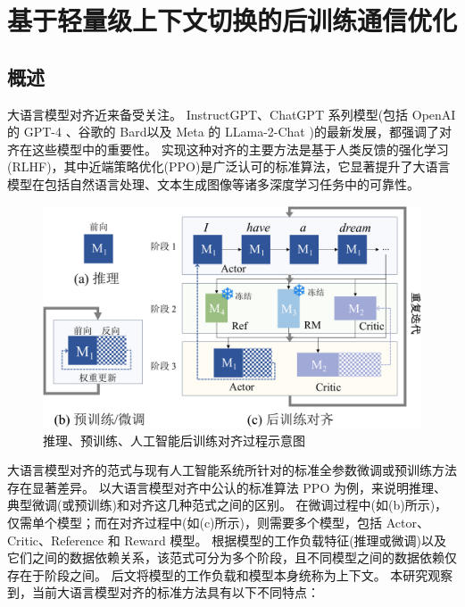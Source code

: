 
\chapter{基于轻量级上下文切换的后训练通信优化}

\section{概述}
大语言模型对齐近来备受关注。
InstructGPT\cite{ouyang2022instructgpt}、ChatGPT\cite{chatgpt} 系列模型(包括 OpenAI 的 GPT-4 \cite{openai2023gpt4}、谷歌的 Bard\cite{bard}以及 Meta 的 LLama-2-Chat \cite{touvron2023llama})的最新发展，都强调了对齐在这些模型中的重要性。
实现这种对齐的主要方法是基于人类反馈的强化学习(RLHF)，其中近端策略优化(PPO)是广泛认可的标准算法，它显著提升了大语言模型在包括自然语言处理\cite{chatgpt,kreutzer2018reliability}、文本生成图像\cite{wu2023visualchatgpt,lee2023aligning}等诸多深度学习任务中的可靠性。 

\begin{figure}[ht]
    \centering
    \includegraphics[width=0.7\linewidth, keepaspectratio]{figures/puzzle/1-intro-aligning-crop.pdf}
    \caption{推理、预训练、人工智能后训练对齐过程示意图}
    \label{fig:intro-aligning}
\end{figure}


大语言模型对齐的范式与现有人工智能系统所针对的标准全参数微调或预训练方法存在显著差异。
以大语言模型对齐中公认的标准算法 PPO 为例，来说明推理、典型微调(或预训练)和对齐这几种范式之间的区别。
在微调过程中(如(b)所示)，仅需单个模型；而在对齐过程中(如(c)所示)，则需要多个模型，包括 Actor、Critic、Reference 和 Reward 模型。
根据模型的工作负载特征(推理或微调)以及它们之间的数据依赖关系，该范式可分为多个阶段，且不同模型之间的数据依赖仅存在于阶段之间。
后文将模型的工作负载和模型本身统称为上下文。 
本研究观察到，当前大语言模型对齐的标准方法具有以下不同特点： 

